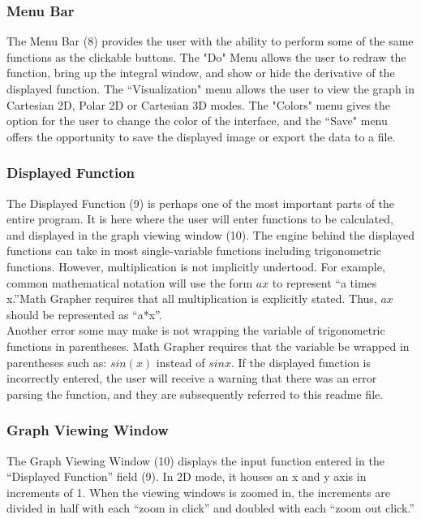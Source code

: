\documentclass{article}[12 pt]
\begin{document}
			\subsubsection{Menu Bar}
			The Menu Bar (8) provides the user with the ability to perform some of the same functions as the clickable buttons. The "Do" Menu allows the user to redraw the function, bring up the integral window, and show or hide the derivative of the displayed function. The ``Visualization" menu allows the user to view the graph in Cartesian 2D, Polar 2D or Cartesian 3D modes. The "Colors" menu gives the option for the user to change the color of the interface, and the ``Save" menu offers the opportunity to save the displayed image or export the data to a file. 
 	
			\subsubsection{Displayed Function}
			The Displayed Function (9) is perhaps one of the most important parts of the entire program. It is here where the user will enter functions to be calculated, and displayed in the graph viewing window (10). The engine behind the displayed functions can take in most single-variable functions including trigonometric functions. However, multiplication is not implicitly undertood. For example, common mathematical notation will use the form $ax$ to represent ``a times x.''Math Grapher requires that all multiplication is explicitly stated. Thus, $ax$ should be represented as ``a*x''. \\
			
			Another error some may make is not wrapping the variable of trigonometric functions in parentheses. Math Grapher requires that the variable be wrapped in parentheses such as: $sin(x)$ instead of $sinx$. If the displayed function is incorrectly entered, the user will receive a warning that there was an error parsing the function, and they are subsequently referred to this readme file.
			
			\subsubsection{Graph Viewing Window}
			The Graph Viewing Window (10) displays the input function entered in the ``Displayed Function'' field (9). In 2D mode, it houses an x and y axis in increments of 1. When the viewing windows is zoomed in, the increments are divided in half with each ``zoom in click'' and doubled with each ``zoom out click.''
			
\end{document}
